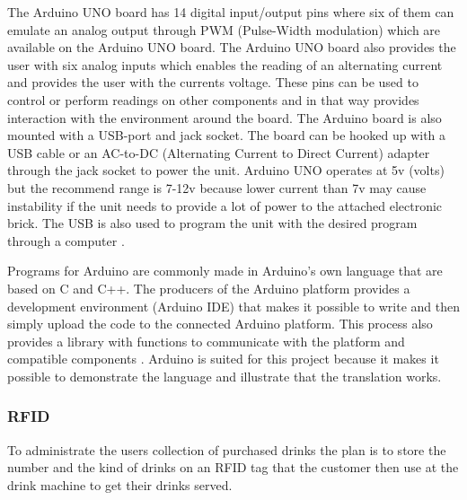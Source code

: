 The Arduino UNO board has 14 digital input/output pins where six of them can emulate an analog output through PWM (Pulse-Width modulation) which are available on the Arduino UNO board. The Arduino UNO board also provides the user with six analog inputs which enables the reading of an alternating current and provides the user with the currents voltage. These pins can be used to control or perform readings on other components and in that way provides interaction with the environment around the board.
The Arduino board is also mounted with a USB-port and jack socket. The board can be hooked up with a USB cable or an AC-to-DC (Alternating Current to Direct Current) adapter through the jack socket to power the unit. Arduino UNO operates at 5v (volts) but the recommend range is 7-12v because lower current than 7v may cause instability if the unit needs to provide a lot of power to the attached electronic brick. The USB is also used to program the unit with the desired program through a computer \citep{ArduinoUno}.

Programs for Arduino are commonly made in Arduino's own language that are based on C and C++. The producers of the Arduino platform provides a development environment (Arduino IDE) that makes it possible to write and then simply upload the code to the connected Arduino platform. This process also provides a library with functions to communicate with the platform and compatible components \citep{ArduinoLanguage}.
Arduino is suited for this project because it makes it possible to demonstrate the language and illustrate that the translation works.

\subsubsection{RFID}
To administrate the users collection of purchased drinks the plan is to store the number and the kind of drinks on an RFID tag that the customer then use at the drink machine to get their drinks served.

